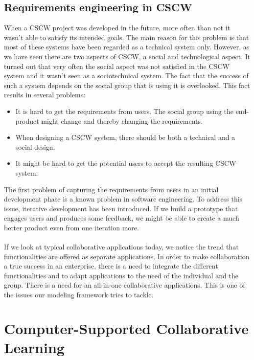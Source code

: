 \subsection{Requirements engineering in CSCW}

When a CSCW project was developed in the future, more often than not it wasn't able to satisfy its intended goals. The main reason for this problem is that most of these systems have been regarded as a technical system only. However, as we have seen there are two aspects of CSCW, a social and technological aspect. It turned out that very often the social aspect was not satisfied in the CSCW system and it wasn't seen as a sociotechnical system. The fact that the success of such a system depends on the social group that is using it is overlooked. This fact results in several problems:

\begin{itemize}
\item{It is hard to get the requirements from users. The social group using the end-product might change and thereby changing the requirements.}
\item{When designing a CSCW system, there should be both a technical and a social design.}
\item{It might be hard to get the potential users to accept the resulting CSCW system.}
\end{itemize}

The first problem of capturing the requirements from users in an initial development phase is a known problem in software engineering. To address this issue, iterative development has been introduced. If we build a prototype that engages users and produces some feedback, we might be able to create a much better product even from one iteration more.
\\ \\
If we look at typical collaborative applications today, we notice the trend that functionalities are offered as separate applications. In order to make collaboration a true success in an enterprise, there is a need to integrate the different functionalities and to adapt applications to the need of the individual and the group. There is a need for an all-in-one collaborative applications. This is one of the issues our modeling framework tries to tackle. 

\section{Computer-Supported Collaborative Learning}

